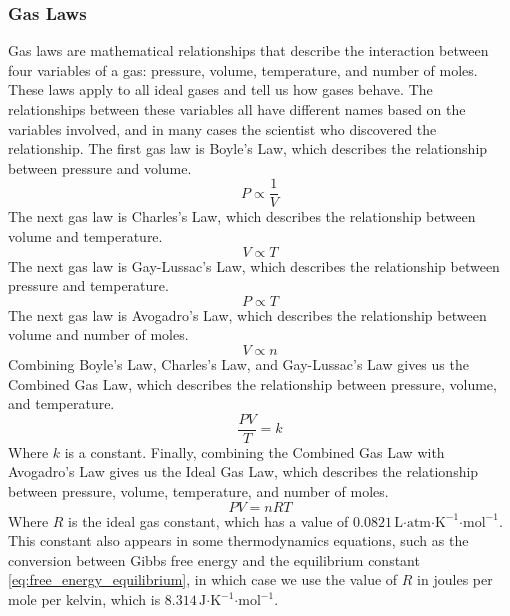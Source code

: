 \subsubsection{Gas Laws}
Gas laws are mathematical relationships that describe the interaction between four variables of a gas: pressure, volume, temperature, and number of moles. These laws apply to all ideal gases and tell us how gases behave. The relationships between these variables all have different names based on the variables involved, and in many cases the scientist who discovered the relationship. 
The first gas law is Boyle's Law, which describes the relationship between pressure and volume.
\begin{equation}\label{eq:boyle}
    P \propto \frac{1}{V}
\end{equation}
The next gas law is Charles's Law, which describes the relationship between volume and temperature.
\begin{equation}\label{eq:charles}
    V \propto T
\end{equation}
The next gas law is Gay-Lussac's Law, which describes the relationship between pressure and temperature.
\begin{equation}\label{eq:gaylussac}
    P \propto T
\end{equation}
The next gas law is Avogadro's Law, which describes the relationship between volume and number of moles.
\begin{equation}\label{eq:avogadro}
    V \propto n
\end{equation}
Combining Boyle's Law, Charles's Law, and Gay-Lussac's Law gives us the Combined Gas Law, which describes the relationship between pressure, volume, and temperature.
\begin{equation}\label{eq:combined}
    \frac{PV}{T} = k
\end{equation}
Where $k$ is a constant. 
Finally, combining the Combined Gas Law with Avogadro's Law gives us the Ideal Gas Law, which describes the relationship between pressure, volume, temperature, and number of moles.
\begin{equation}\label{eq:ideal}
    PV = nRT
\end{equation}
Where $R$ is the ideal gas constant, which has a value of $0.0821 \, \text{L·atm·K}^{-1}\text{·mol}^{-1}$. This constant also appears in some thermodynamics equations, such as the conversion between Gibbs free energy and the equilibrium constant \eqref{eq:free_energy_equilibrium}, in which case we use the value of $R$ in joules per mole per kelvin, which is $8.314 \, \text{J·K}^{-1}\text{·mol}^{-1}$.
